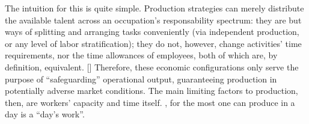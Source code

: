 \documentclass[hidelinks, nonatbib]{elsarticle}
\begin{document}
\begin{enumerate}
    The intuition for this is quite simple. Production strategies can merely distribute the available talent across an occupation's responsability spectrum: they are but ways of splitting and arranging tasks conveniently (via independent production, or any level of labor stratification); they do not, however, change activities' time requirements, nor the time allowances of employees, both of which are, by definition, equivalent. [] Therefore, these economic configurations only serve the purpose of ``safeguarding'' operational output, guaranteeing production in potentially adverse market conditions. The main limiting factors to production, then, are workers' capacity and time itself.
    , for the most one can produce in a day is a ``day's work''.


\end{enumerate}
\end{document}
